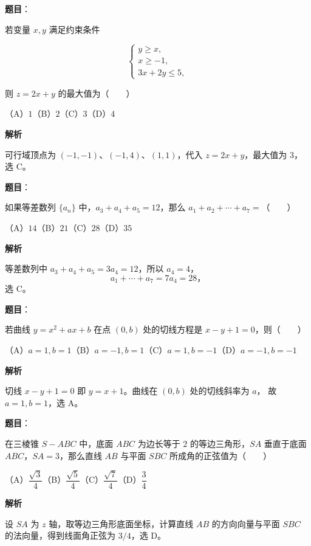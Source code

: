 \begin{answer}

\textbf{题目}：

若变量 $x,y$ 满足约束条件

\nopagebreak[4]
\[
\begin{cases}
y\geq x,\\
x\geq-1,\\
3x+2y\leq5,
\end{cases}
\]

则 $z=2x+y$ 的最大值为\mbox{（　　）}

（A）$1$\quad（B）$2$\quad（C）$3$\quad（D）$4$

\textbf{解析}

可行域顶点为 $(-1,-1)$、$(-1,4)$、$(1,1)$，代入 $z=2x+y$，最大值为 $3$，选 C。


\end{answer}
\begin{answer}

\textbf{题目}：

如果等差数列 $\{a_n\}$ 中，$a_3+a_4+a_5=12$，那么 $a_1+a_2+\cdots+a_7=$\mbox{（　　）}

（A）$14$\quad（B）$21$\quad（C）$28$\quad（D）$35$

\textbf{解析}

等差数列中 $a_3+a_4+a_5=3a_4=12$，所以 $a_4=4$，
\nopagebreak[4]
\[
a_1+\cdots+a_7=7a_4=28\text{，}
\]
选 C。


\end{answer}
\begin{answer}

\textbf{题目}：

若曲线 $y=x^2+ax+b$ 在点 $(0,b)$ 处的切线方程是 $x-y+1=0$，则\mbox{（　　）}

（A）$a=1,b=1$\quad（B）$a=-1,b=1$\quad（C）$a=1,b=-1$\quad（D）$a=-1,b=-1$

\textbf{解析}

切线 $x-y+1=0$ 即 $y=x+1$。曲线在 $(0,b)$ 处的切线斜率为 $a$，
故 $a=1,b=1$，选 A。


\end{answer}
\begin{answer}

\textbf{题目}：

在三棱锥 $S-ABC$ 中，底面 $ABC$ 为边长等于 $2$ 的等边三角形，$SA$ 垂直于底面 $ABC$，$SA=3$，那么直线 $AB$ 与平面 $SBC$ 所成角的正弦值为\mbox{（　　）}

（A）$\dfrac{\sqrt3}{4}$\quad（B）$\dfrac{\sqrt5}{4}$\quad（C）$\dfrac{\sqrt7}{4}$\quad（D）$\dfrac34$

\textbf{解析}

设 $SA$ 为 $z$ 轴，取等边三角形底面坐标，计算直线 $AB$ 的方向向量与平面
$SBC$ 的法向量，得到线面角正弦为 $3/4$，选 D。


\end{answer}
